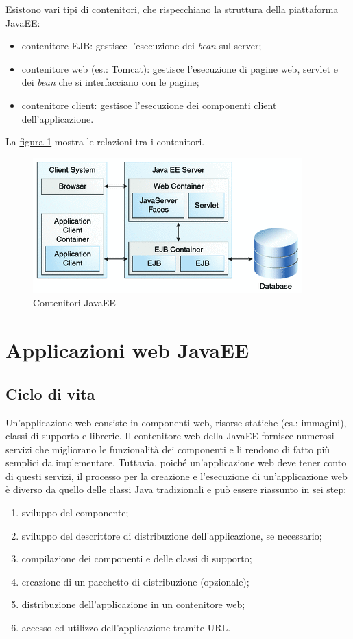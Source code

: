 Esistono vari tipi di contenitori, che rispecchiano la struttura della piattaforma JavaEE:
\begin{itemize}
	\item contenitore EJB: gestisce l'esecuzione dei \textit{bean} sul server;
	\item contenitore web (es.: Tomcat): gestisce l'esecuzione di pagine web, servlet e dei \textit{bean} che si interfacciano con le pagine;
	\item contenitore client: gestisce l'esecuzione dei componenti client dell'applicazione.
\end{itemize}
La \hyperref[fig:javaee-contenitori]{figura \ref{fig:javaee-contenitori}}\autocite{bib:javaee-tutorial} mostra le relazioni tra i contenitori.
\begin{figure}
	\centering
	\includegraphics{Immagini/javaee-contenitori.png}
	\caption{Contenitori JavaEE}
	\label{fig:javaee-contenitori}
\end{figure}

\section{Applicazioni web JavaEE}
\subsection{Ciclo di vita}
Un'applicazione web consiste in componenti web, risorse statiche (es.: immagini), classi di supporto e librerie. Il contenitore web della JavaEE fornisce numerosi servizi che migliorano le funzionalità dei componenti e li rendono di fatto più semplici da implementare. Tuttavia, poiché un'applicazione web deve tener conto di questi servizi, il processo per la creazione e l'esecuzione di un'applicazione web è diverso da quello delle classi Java tradizionali e può essere riassunto in sei step:
\begin{enumerate}
	\item sviluppo del componente;
	\item sviluppo del \gls{descrittore di distribuzione} dell'applicazione, se necessario;
	\item compilazione dei componenti e delle classi di supporto;
	\item creazione di un pacchetto di distribuzione (opzionale);
	\item distribuzione dell'applicazione in un contenitore web;
	\item accesso ed utilizzo dell'applicazione tramite \Gls{URL}.
\end{enumerate}

